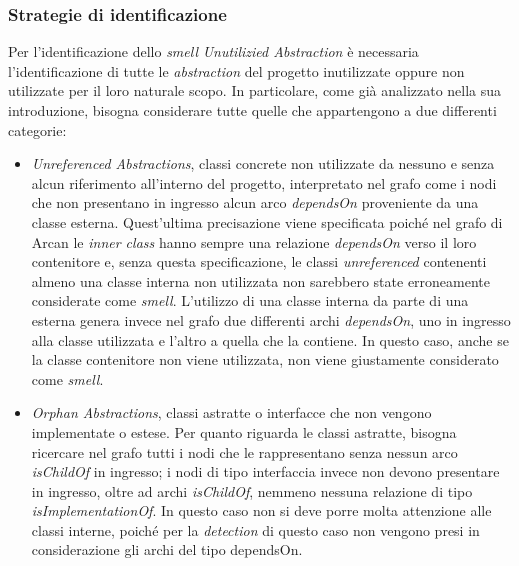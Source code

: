     \subsubsection{Strategie di identificazione}
        Per l'identificazione dello \textit{smell} \textit{Unutilizied Abstraction} è necessaria l'identificazione di tutte le \textit{abstraction} del progetto inutilizzate oppure non utilizzate per il loro naturale scopo. In particolare, come già analizzato nella sua introduzione, bisogna considerare tutte quelle che appartengono a due differenti categorie:
        \begin{itemize}
            \item \textit{Unreferenced Abstractions}, classi concrete non utilizzate da nessuno e senza alcun riferimento all'interno del progetto, interpretato nel grafo come i nodi che non presentano in ingresso alcun arco \textit{dependsOn} proveniente da una classe esterna.
            Quest'ultima precisazione viene specificata poiché nel grafo di Arcan le \textit{inner class} hanno sempre una relazione \textit{dependsOn} verso il loro contenitore e, senza questa specificazione, le classi \textit{unreferenced} contenenti almeno una classe interna non utilizzata non sarebbero state erroneamente considerate come \textit{smell}. 
            L'utilizzo di una classe interna da parte di una esterna genera invece nel grafo due differenti archi \textit{dependsOn}, uno in ingresso alla classe utilizzata e l'altro a quella che la contiene. In questo caso, anche se la classe contenitore non viene utilizzata, non viene giustamente considerato come \textit{smell}.  
            
            \item \textit{Orphan Abstractions}, classi astratte o interfacce che non vengono implementate o estese. Per quanto riguarda le classi astratte, bisogna ricercare nel grafo tutti i nodi che le rappresentano senza nessun arco \textit{isChildOf} in ingresso; i nodi di tipo interfaccia invece non devono presentare in ingresso, oltre ad archi \textit{isChildOf}, nemmeno nessuna relazione di tipo \textit{isImplementationOf}.
            In questo caso non si deve porre molta attenzione alle classi interne, poiché per la \textit{detection} di questo caso non vengono presi in considerazione gli archi del tipo dependsOn.
        \end{itemize}
        
